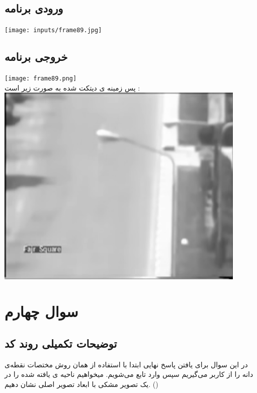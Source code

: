 \documentclass[12pt]{article}
\begin{document}
		\subsection{ورودی برنامه}
		\texttt{[image: inputs/frame89.jpg]}
		\subsection{خروجی برنامه}
		\texttt{[image: frame89.png]}\\
		پس زمینه ی دیتکت شده به صورت زیر است :\\
		\includegraphics[width=12cm]{background.jpg}
		
		\newpage
		
		\section{سوال چهارم }
		\subsection{توضیحات تکمیلی روند کد}
	 در این سوال برای یافتن پاسخ نهایی ابتدا با استفاده از همان روش 
	 مختصات نقطه‌ی دانه را از کاربر می‌گیریم سپس وارد تابع می‌شویم. میخواهیم ناحیه ی یافته شده را در یک تصویر مشکی با ابعاد تصویر اصلی نشان دهیم. 
	 ()
	
\end{document}
